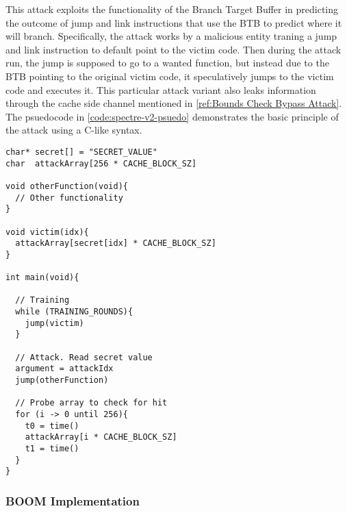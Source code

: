 This attack exploits the functionality of the Branch Target Buffer in predicting the outcome
of jump and link instructions that use the BTB to predict where it will branch. Specifically, 
the attack works by a malicious entity traning a jump and link instruction to default point to 
the victim code. Then during the attack run, the jump is supposed to go to a wanted function,
but instead due to the BTB pointing to the original victim code, it speculatively jumps to the
victim code and executes it. This particular attack variant also leaks information through the
cache side channel mentioned in \ref{ref:Bounds Check Bypass Attack}. The psuedocode in 
\ref{code:spectre-v2-psuedo} demonstrates the basic principle of the attack using a C-like syntax.

\begin{lstlisting}[caption=Psuedocode of Bounds Check Bypass Attack]
char* secret[] = "SECRET_VALUE"
char  attackArray[256 * CACHE_BLOCK_SZ]

void otherFunction(void){
  // Other functionality    
}

void victim(idx){
  attackArray[secret[idx] * CACHE_BLOCK_SZ]
}

int main(void){
  
  // Training
  while (TRAINING_ROUNDS){
    jump(victim)
  }

  // Attack. Read secret value
  argument = attackIdx
  jump(otherFunction)

  // Probe array to check for hit
  for (i -> 0 until 256){
    t0 = time()
    attackArray[i * CACHE_BLOCK_SZ]
    t1 = time()
  }
}
\end{lstlisting}\label{code:spectre-v1-pseudo}

\subsubsection{BOOM Implementation}

